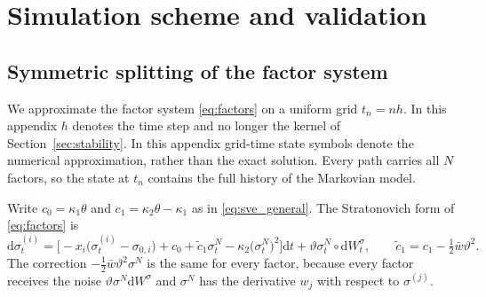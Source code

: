 \documentclass{rQUF2e}
\theoremstyle{plain}
\theoremstyle{definition}
\theoremstyle{remark}
\newcommand{\D}{\mathrm{d}}
\begin{document}
\section{Simulation scheme and validation}\label{app:simulation}

\subsection{Symmetric splitting of the factor system}\label{sec:splitting}

We approximate the factor system \eqref{eq:factors} on a uniform grid $t_n=nh$. In this appendix $h$ denotes the time step and no longer the kernel of Section~\ref{sec:stability}. In this appendix grid-time state symbols denote the numerical approximation, rather than the exact solution. Every path carries all $N$ factors, so the state at $t_n$ contains the full history of the Markovian model.

Write $c_0=\kappa_1\theta$ and $c_1=\kappa_2\theta-\kappa_1$ as in \eqref{eq:sve_general}. The Stratonovich form of \eqref{eq:factors} is
\begin{equation}\label{eq:factors_strat}
\D\sigma^{(i)}_t=\Big[-x_i\big(\sigma^{(i)}_t-\sigma_{0,i}\big)+c_0+\tilde c_1\sigma^N_t-\kappa_2\big(\sigma^N_t\big)^2\Big]\D t+\vartheta\sigma^N_t\circ\D W^\sigma_t,\qquad \tilde c_1=c_1-\tfrac12\bar w\vartheta^2 .
\end{equation}
The correction $-\tfrac12\bar w\vartheta^2\sigma^N$ is the same for every factor, because every factor receives the noise $\vartheta\sigma^N\D W^\sigma$ and $\sigma^N$ has the derivative $w_j$ with respect to $\sigma^{(j)}$.
\end{document}
